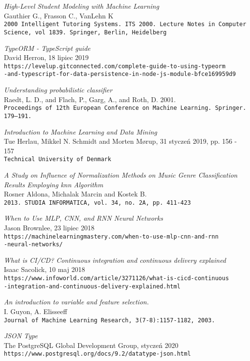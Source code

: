 \begin{thebibliography}{20}
\textit{High-Level Student Modeling with Machine Learning}
\\Gauthier G., Frasson C., VanLehn K
\\\texttt{2000 Intelligent Tutoring Systems. ITS 2000. Lecture Notes in Computer Science, vol 1839. Springer, Berlin, Heidelberg}


\textit{TypeORM - TypeScript guide}
\\David Herron, 18 lipiec 2019
\\\texttt{https://levelup.gitconnected.com/complete-guide-to-using-typeorm\\-and-typescript-for-data-persistence-in-node-js-module-bfce169959d9}

\textit{Understanding probabilistic classifier}
\\Raedt, L. D., and Flach, P., Garg, A., and Roth, D. 2001.
\\\texttt{Proceedings of 12th European Conference on Machine Learning. Springer. 179–191.}


\textit{Introduction to Machine Learning and Data Mining}
\\Tue Herlau, Mikkel N. Schmidt and Morten Mørup, 31 styczeń 2019, pp. 156 - 157
\\\texttt{Technical University of Denmark}


\textit{A Study on Influence of Normalization Methods on Music Genre Classification Results Employing knn Algorithm}
\\Rosner Aldona, Michalak Marcin and Kostek B.
\\\texttt{2013. STUDIA INFORMATICA, vol. 34, no. 2A, pp. 411-423}

\textit{When to Use MLP, CNN, and RNN Neural Networks}
\\Jason Brownlee, 23 lipiec 2018
\\\texttt{https://machinelearningmastery.com/when-to-use-mlp-cnn-and-rnn\\-neural-networks/}

\textit{What is CI/CD? Continuous integration and continuous delivery explained}
\\Isaac Sacolick, 10 maj 2018
\\\texttt{https://www.infoworld.com/article/3271126/what-is-cicd-continuous\\-integration-and-continuous-delivery-explained.html}

\textit{An introduction to variable and feature selection.}
\\I. Guyon, A. Elisseeff
\\\texttt{Journal of Machine Learning Research, 3(7-8):1157-1182, 2003.}

\textit{JSON Type}
\\The PostgreSQL Global Development Group, styczeń 2020
\\\texttt{https://www.postgresql.org/docs/9.2/datatype-json.html}




\end{thebibliography}